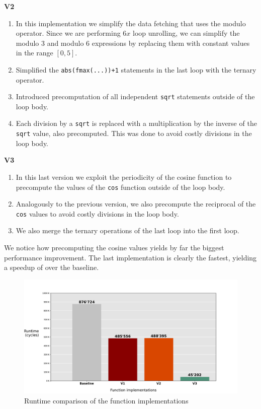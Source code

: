 \textbf{V2}
\vspace*{-0.3cm}
\begin{enumerate}
    \item In this implementation we simplify the data fetching that uses the modulo operator. Since we are performing $6x$ loop unrolling, we can simplify the modulo 3 and modulo 6 expressions by replacing them with constant values in the range $[0, 5]$. 
    \item Simplified the \texttt{abs(fmax(...))+1} statements in the last loop with the ternary operator.
    \item Introduced precomputation of all independent \texttt{sqrt} statements outside of the loop body.
    \item Each division by a \texttt{sqrt} is replaced with a multiplication by the inverse of the \texttt{sqrt} value, also precomputed. This was done to avoid costly divisions in the loop body.
\end{enumerate}

\textbf{V3}
\vspace*{-0.3cm}
\begin{enumerate}
\item In this last version we exploit the periodicity of the cosine function to precompute the values of the \texttt{cos} function outside of the loop body.
\item Analogously to the previous version, we also precompute the reciprocal of the \texttt{cos} values to avoid costly divisions in the loop body.
\item We also merge the ternary operations of the last loop into the first loop.
\end{enumerate}
We notice how precomputing the cosine values yields by far the biggest performance improvement. The last implementation is clearly the fastest, yielding a speedup of \textbf{} over the baseline.
\begin{figure}[h!]
    \centering
    \includegraphics[width=\linewidth]{../out/ex2_a.pdf}
    \caption{Runtime comparison of the function implementations}
    \label{fig:1a}
\end{figure}

